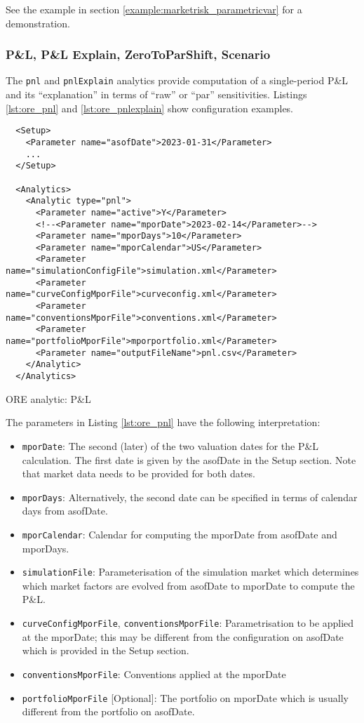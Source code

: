 {See the example in section \ref{example:marketrisk_parametricvar} for a demonstration.

\subsubsection{P\&L, P\&L Explain, ZeroToParShift, Scenario}

The {\tt pnl} and {\tt pnlExplain} analytics provide computation of a single-period P\&L and its
``explanation'' in terms of ``raw'' or ``par'' sensitivities. Listings \ref{lst:ore_pnl} and
\ref{lst:ore_pnlexplain} show configuration examples.

\begin{listing}[H]
\begin{verbatim}
  <Setup>
    <Parameter name="asofDate">2023-01-31</Parameter>
    ...
  </Setup>

  <Analytics>
    <Analytic type="pnl">
      <Parameter name="active">Y</Parameter>
      <!--<Parameter name="mporDate">2023-02-14</Parameter>-->
      <Parameter name="mporDays">10</Parameter>
      <Parameter name="mporCalendar">US</Parameter>
      <Parameter name="simulationConfigFile">simulation.xml</Parameter>
      <Parameter name="curveConfigMporFile">curveconfig.xml</Parameter>
      <Parameter name="conventionsMporFile">conventions.xml</Parameter>
      <Parameter name="portfolioMporFile">mporportfolio.xml</Parameter>
      <Parameter name="outputFileName">pnl.csv</Parameter>
    </Analytic>
  </Analytics>
\end{verbatim}
\caption{ORE analytic: P\&L}
\label{lst:ore_pnl}
\end{listing}

The parameters in Listing \ref{lst:ore_pnl} have the following interpretation:

\begin{itemize}
\item {\tt mporDate}: The second (later) of the two valuation dates for the P\&L calculation. The first date is given by the asofDate in the Setup section. Note that market data needs to be provided for both dates. 
\item {\tt mporDays}: Alternatively, the second date can be specified in terms of calendar days from asofDate.
\item {\tt mporCalendar}: Calendar for computing the mporDate from asofDate and mporDays.
\item {\tt simulationFile}: Parameterisation of the simulation market which determines which market factors are evolved from asofDate to mporDate to compute the P\&L.
\item {\tt curveConfigMporFile}, {\tt conventionsMporFile}: Parametrisation to be applied at the mporDate; this may be different from the configuration on asofDate which is provided in the Setup section.
\item {\tt conventionsMporFile}: Conventions applied at the mporDate
\item {\tt portfolioMporFile} [Optional]: The portfolio on mporDate which is usually different from the portfolio on asofDate.  
\end{itemize}

}
